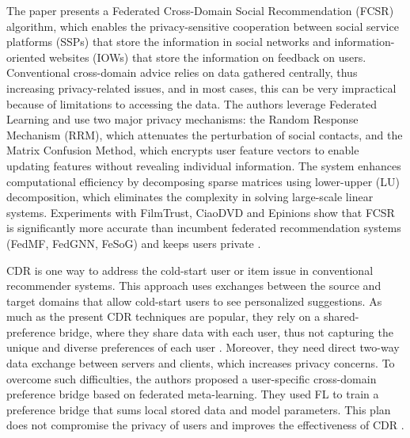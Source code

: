 The paper presents a Federated Cross-Domain Social Recommendation (FCSR) algorithm, which enables the privacy-sensitive cooperation between social service platforms (SSPs) that store the information in social networks and information-oriented websites (IOWs) that store the information on feedback on users. Conventional cross-domain advice relies on data gathered centrally, thus increasing privacy-related issues, and in most cases, this can be very impractical because of limitations to accessing the data. The authors leverage Federated Learning and use two major privacy mechanisms: the Random Response Mechanism (RRM), which attenuates the perturbation of social contacts, and the Matrix Confusion Method, which encrypts user feature vectors to enable updating features without revealing individual information. The system enhances computational efficiency by decomposing sparse matrices using lower-upper (LU) decomposition, which eliminates the complexity in solving large-scale linear systems. Experiments with FilmTrust, CiaoDVD and Epinions show that FCSR is significantly more accurate than incumbent federated recommendation systems (FedMF, FedGNN, FeSoG) and keeps users private  \cite{ref44}.

CDR is one way to address the cold-start user or item issue in conventional recommender systems. This approach uses exchanges between the source and target domains that allow cold-start users to see personalized suggestions. As much as the present CDR techniques are popular, they rely on a shared-preference bridge, where they share data with each user, thus not capturing the unique and diverse preferences of each user \cite{ref50}.  Moreover, they need direct two-way data exchange between servers and clients, which increases privacy concerns. To overcome such difficulties, the authors proposed a user-specific cross-domain preference bridge based on federated meta-learning. They used FL to train a preference bridge that sums local stored data and model parameters. This plan does not compromise the privacy of users and improves the effectiveness of CDR \cite{ref45}.

